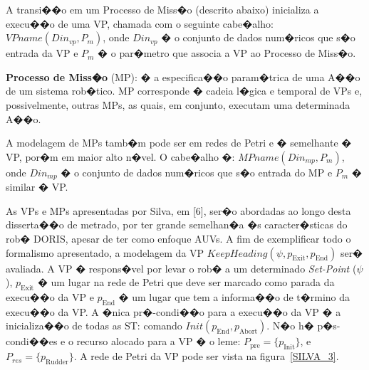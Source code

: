 A transi��o em um Processo de Miss�o (descrito abaixo) inicializa a execu��o de
uma VP, chamada com o seguinte cabe�alho: $VPname(Din_{vp},P_m)$, onde
$Din_{vp}$ � o conjunto de dados num�ricos que s�o entrada da VP e $P_m$ � o
par�metro que associa a VP ao Processo de Miss�o.

\textbf{Processo de Miss�o} (MP): � a especifica��o param�trica de uma A��o de
um sistema rob�tico. MP corresponde � cadeia l�gica e temporal de VPs e,
possivelmente, outras MPs, as quais, em conjunto, executam uma determinada A��o.

A modelagem de MPs tamb�m pode ser em redes de Petri e � semelhante � VP, por�m
em maior alto n�vel. O cabe�alho �: $MPname(Din_{mp},P_m)$, onde
$Din_{mp}$ � o conjunto de dados num�ricos que s�o entrada do MP e $P_m$ �
similar � VP.

As VPs e MPs apresentadas por Silva, em [6], ser�o abordadas ao longo desta
disserta��o de metrado, por ter grande semelhan�a �s caracter�sticas do rob�
DORIS, apesar de ter como enfoque AUVs. A fim de exemplificar todo o formalismo
apresentado, a modelagem da VP
$KeepHeading(\psi,p_{\textrm{Exit}},p_{\textrm{End}})$ ser� avaliada. A
VP � respons�vel por levar o rob� a um determinado \emph{Set-Point} ($\psi$),
$p_{\textrm{Exit}}$ � um lugar na rede de Petri que deve ser marcado como parada
da execu��o da VP e $p_{\textrm{End}}$ � um lugar que tem a informa��o de
t�rmino da execu��o da VP. A �nica pr�-condi��o para a execu��o da VP � a
inicializa��o de todas as ST: comando
$Init(p_{\textrm{End}},p_{\textrm{Abort}})$. N�o h� p�s-condi��es e o recurso
alocado para a VP � o leme: $P_{\textrm{pre}}=\{p_{\textrm{Init}}\}$, e
$P_{res}=\{p_{\textrm{Rudder}}\}$.
A rede de Petri da VP pode ser vista na figura~\ref{SILVA_3}.

